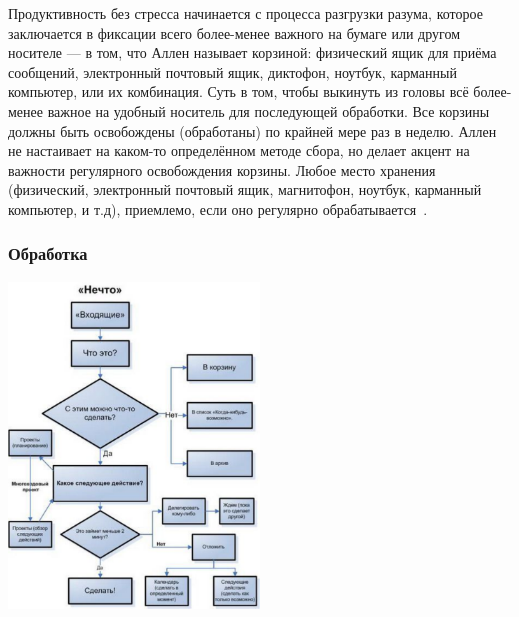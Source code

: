 \documentclass{../industrial-development}
\begin{document}
\lecturenotes

Продуктивность без стресса начинается с процесса разгрузки разума, которое заключается в фиксации всего более-менее важного на бумаге или другом носителе — в том, что Аллен называет корзиной: физический ящик для приёма сообщений, электронный почтовый ящик, диктофон, ноутбук, карманный компьютер, или их комбинация. Суть в том, чтобы выкинуть из головы всё более-менее важное на удобный носитель для последующей обработки. Все корзины должны быть освобождены (обработаны) по крайней мере раз в неделю. Аллен не настаивает на каком-то определённом методе сбора, но делает акцент на важности регулярного освобождения корзины. Любое место хранения (физический, электронный почтовый ящик, магнитофон, ноутбук, карманный компьютер, и т.д), приемлемо, если оно регулярно обрабатывается~\cite{GTDWikipedia}.

\begin{frame} \frametitle{Обработка}
  \centerline{\includegraphics[width=0.5\textwidth]{GTDalgorithm.pdf}}
\end{frame}

\lecturenotes
\end{document}
